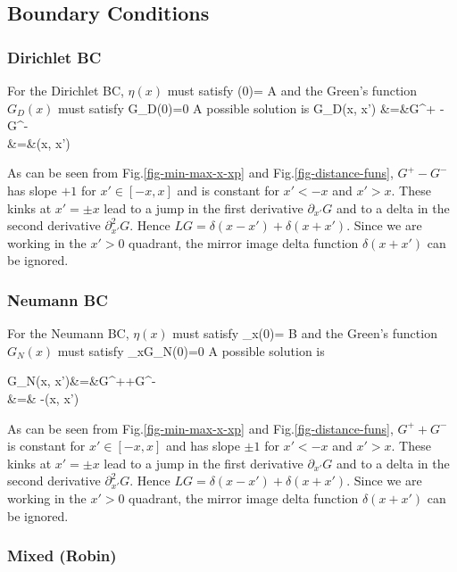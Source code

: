 \subsection{Boundary Conditions}
\subsubsection{Dirichlet BC}

For the Dirichlet BC, $\eta(x)$
must satisfy
\beq
\eta(0)= A
\eeq
and the Green's function $G_D(x)$ must satisfy
\beq
G_D(0)=0
\eeq
A possible solution is
\beqa
G_D(x, x')
&=&G^+ -G^-
\\
&=&\min(x, x')
\quad{}
\eeqa

As can be seen from Fig.\ref{fig-min-max-x-xp}
and Fig.\ref{fig-distance-funs},
$G^+-G^-$ has slope $+1$  for $x'\in [-x, x]$
and is constant for $x'<-x$ and $x'>x$.
These kinks at $x'=\pm x$
lead to a jump in the first derivative $\partial_{x'}G$ and to a delta in the 
second derivative $\partial_{x'}^2G$.
Hence $L G=\delta(x-x') + \delta(x+x')$.
Since we are working in the $x'>0$ quadrant,
the mirror image delta function $\delta(x+x')$ can be 
ignored.


\subsubsection{Neumann BC}
For the Neumann BC, $\eta(x)$
must satisfy
\beq
\partial_x\eta(0)= B
\eeq
and the Green's function $G_N(x)$ must satisfy
\beq
\partial_xG_N(0)=0
\eeq
A possible solution is

\beqa
G_N(x, x')&=&G^++G^- 
\\
&=&
-\max(x, x')
\quad{}
\eeqa

As can be seen from Fig.\ref{fig-min-max-x-xp}
and Fig.\ref{fig-distance-funs},
$G^++G^-$ is constant  for $x'\in [-x, x]$
and has slope $\pm 1$ for $x'<-x$ and $x'>x$.
These kinks at $x'=\pm x$
lead to a jump in the first derivative $\partial_{x'}G$ and to a delta in the 
second derivative $\partial_{x'}^2G$.
Hence $L G=\delta(x-x') + \delta(x+x')$.
Since we are working in the $x'>0$ quadrant,
the mirror image delta function $\delta(x+x')$ can be 
ignored.


\subsubsection{Mixed (Robin)}

